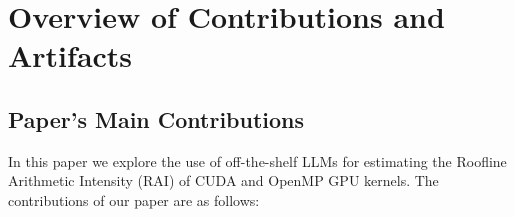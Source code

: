 


%



\newcommand{\hecbench}[0]{\texttt{HeCBench}\xspace}


\appendixAD

\section{Overview of Contributions and Artifacts}

\subsection{Paper's Main Contributions}


In this paper we explore the use of off-the-shelf LLMs for estimating the Roofline Arithmetic Intensity (RAI) of CUDA and OpenMP GPU kernels. 
The contributions of our paper are as follows:

